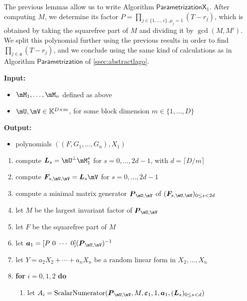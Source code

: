 \documentclass[12pt]{article}
\newcommand{\mat}[1]{\bm{\MakeUppercase{#1}}} %
\newcommand{\row}[1]{\bm{\MakeLowercase{#1}}} %
\newcommand{\col}[1]{\bm{\MakeLowercase{#1}}} %
\newcommand{\seqelt}[1]{\bm{F}_{#1}} %
\newcommand{\mainalgoname}{\mathsf{ BlockParametrization}}
\newcommand{\lf}{X}
\newcommand{\mf}{Y}
\begin{document}
The previous lemmas allow us to write Algorithm
$\mathsf{ParametrizationX}_1$. After computing $M$, we determine its
factor $P=\prod_{j \in \{1,\dots,c\}, \mu_j=1} (T-r_j)$, which is
obtained by taking the squarefree part of $M$ and dividing it by
$\gcd(M,M')$. We split this polynomial further using the previous
results in order to find $\prod_{j \in \mathfrak{a}} (T-r_j)$, and we
conclude using the same kind of calculations as in Algorithm
$\mathsf{Parametrization}$ of \cref{ssec:abstractlago}.


\begin{algorithm}[H]
	\caption{$\mainalgoname{\sf X}_1(\mM_1,\dots,\mM_n,\mU,\mV,\lf$)}
	{\bf Input:} \vspace{-0.5em}
	\begin{itemize}
		\item $\mM_1,\dots,\mM_n$ defined as above
		\item  $\mU,\mV \in \mathbb{K}^{D \times m}$, for some block dimension  $m \in \{1,\dots,D\}$
	\end{itemize}
	{\bf Output:}  \vspace{-0.5em}
        \begin{itemize}
        \item polynomials $((F,G_1,\dots,G_n),X_1)$
        \end{itemize}
  \begin{enumerate}
  \item\label{X1step3} { compute $\mat{L}_s = \mU^{\perp}\mM_1^s$ for $s=0,\dots,2d-1$, with $d = \lceil D/m \rceil$}
  \item\label{X1step4} { compute $\seqelt{s,\mU,\mV}= \mat{L}_s\mV$ for $s=0,\dots, 2d-1$}
  \item\label{X1step5} { compute a minimal matrix generator $\mat{P}_{\mU,\mV}$ of $(\seqelt{s,\mU,\mV})_{0 \le s < 2d}$}
  \item\label{X1step6} { let $M$ be the largest invariant factor of $\mat{P}_{\mU,\mV}$}
  \item\label{X1step7} { let $F$ be  the squarefree part  of $M$}
  \item\label{X1step8} { let $\row{a}_1 = [P~0 ~\cdots~ 0] (\mat{P}_{\mU,\mV})^{-1}$}
  \item let $\mf = a_2 X_2 + \cdots + a_n X_n$ be a random linear form in $X_2,\dots,X_n$
  \item \textbf{for} $i=0,1,2$ \textbf{do}
    \begin{enumerate}
    \item\label{X1step9}  let $A_i = \mathrm{ScalarNumerator}(\mat{P}_{\mU,\mV}, M, \col{\varepsilon}_1, 1, \row{a}_1, (\mat{L}_s)_{0 \le s<d})$

\end{enumerate}
\end{enumerate}
\end{algorithm}
\end{document}
